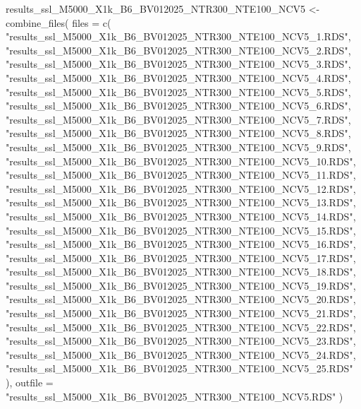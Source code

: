 \documentclass[
]{article}
\newenvironment{Shaded}{\begin{snugshade}}{\end{snugshade}}
\newcommand{\AttributeTok}[1]{\textcolor[rgb]{0.77,0.63,0.00}{#1}}
\newcommand{\FunctionTok}[1]{\textcolor[rgb]{0.00,0.00,0.00}{#1}}
\newcommand{\NormalTok}[1]{#1}
\newcommand{\OtherTok}[1]{\textcolor[rgb]{0.56,0.35,0.01}{#1}}
\newcommand{\StringTok}[1]{\textcolor[rgb]{0.31,0.60,0.02}{#1}}
\begin{document}
\begin{Shaded}
\begin{Highlighting}[]
\NormalTok{results\_ssl\_M5000\_X1k\_B6\_BV012025\_NTR300\_NTE100\_NCV5 }\OtherTok{\textless{}{-}} \FunctionTok{combine\_files}\NormalTok{(}
  \AttributeTok{files =} \FunctionTok{c}\NormalTok{(}
    \StringTok{"results\_ssl\_M5000\_X1k\_B6\_BV012025\_NTR300\_NTE100\_NCV5\_1.RDS"}\NormalTok{,}
    \StringTok{"results\_ssl\_M5000\_X1k\_B6\_BV012025\_NTR300\_NTE100\_NCV5\_2.RDS"}\NormalTok{,}
    \StringTok{"results\_ssl\_M5000\_X1k\_B6\_BV012025\_NTR300\_NTE100\_NCV5\_3.RDS"}\NormalTok{,}
    \StringTok{"results\_ssl\_M5000\_X1k\_B6\_BV012025\_NTR300\_NTE100\_NCV5\_4.RDS"}\NormalTok{,}
    \StringTok{"results\_ssl\_M5000\_X1k\_B6\_BV012025\_NTR300\_NTE100\_NCV5\_5.RDS"}\NormalTok{,}
    \StringTok{"results\_ssl\_M5000\_X1k\_B6\_BV012025\_NTR300\_NTE100\_NCV5\_6.RDS"}\NormalTok{,}
    \StringTok{"results\_ssl\_M5000\_X1k\_B6\_BV012025\_NTR300\_NTE100\_NCV5\_7.RDS"}\NormalTok{,}
    \StringTok{"results\_ssl\_M5000\_X1k\_B6\_BV012025\_NTR300\_NTE100\_NCV5\_8.RDS"}\NormalTok{,}
    \StringTok{"results\_ssl\_M5000\_X1k\_B6\_BV012025\_NTR300\_NTE100\_NCV5\_9.RDS"}\NormalTok{,}
    \StringTok{"results\_ssl\_M5000\_X1k\_B6\_BV012025\_NTR300\_NTE100\_NCV5\_10.RDS"}\NormalTok{,}
    \StringTok{"results\_ssl\_M5000\_X1k\_B6\_BV012025\_NTR300\_NTE100\_NCV5\_11.RDS"}\NormalTok{,}
    \StringTok{"results\_ssl\_M5000\_X1k\_B6\_BV012025\_NTR300\_NTE100\_NCV5\_12.RDS"}\NormalTok{,}
    \StringTok{"results\_ssl\_M5000\_X1k\_B6\_BV012025\_NTR300\_NTE100\_NCV5\_13.RDS"}\NormalTok{,}
    \StringTok{"results\_ssl\_M5000\_X1k\_B6\_BV012025\_NTR300\_NTE100\_NCV5\_14.RDS"}\NormalTok{,}
    \StringTok{"results\_ssl\_M5000\_X1k\_B6\_BV012025\_NTR300\_NTE100\_NCV5\_15.RDS"}\NormalTok{,}
    \StringTok{"results\_ssl\_M5000\_X1k\_B6\_BV012025\_NTR300\_NTE100\_NCV5\_16.RDS"}\NormalTok{,}
    \StringTok{"results\_ssl\_M5000\_X1k\_B6\_BV012025\_NTR300\_NTE100\_NCV5\_17.RDS"}\NormalTok{,}
    \StringTok{"results\_ssl\_M5000\_X1k\_B6\_BV012025\_NTR300\_NTE100\_NCV5\_18.RDS"}\NormalTok{,}
    \StringTok{"results\_ssl\_M5000\_X1k\_B6\_BV012025\_NTR300\_NTE100\_NCV5\_19.RDS"}\NormalTok{,}
    \StringTok{"results\_ssl\_M5000\_X1k\_B6\_BV012025\_NTR300\_NTE100\_NCV5\_20.RDS"}\NormalTok{,}
    \StringTok{"results\_ssl\_M5000\_X1k\_B6\_BV012025\_NTR300\_NTE100\_NCV5\_21.RDS"}\NormalTok{,}
    \StringTok{"results\_ssl\_M5000\_X1k\_B6\_BV012025\_NTR300\_NTE100\_NCV5\_22.RDS"}\NormalTok{,}
    \StringTok{"results\_ssl\_M5000\_X1k\_B6\_BV012025\_NTR300\_NTE100\_NCV5\_23.RDS"}\NormalTok{,}
    \StringTok{"results\_ssl\_M5000\_X1k\_B6\_BV012025\_NTR300\_NTE100\_NCV5\_24.RDS"}\NormalTok{,}
    \StringTok{"results\_ssl\_M5000\_X1k\_B6\_BV012025\_NTR300\_NTE100\_NCV5\_25.RDS"}
\NormalTok{  ),}
  \AttributeTok{outfile =} \StringTok{"results\_ssl\_M5000\_X1k\_B6\_BV012025\_NTR300\_NTE100\_NCV5.RDS"}
\NormalTok{)}


\end{Highlighting}
\end{Shaded}
\end{document}
